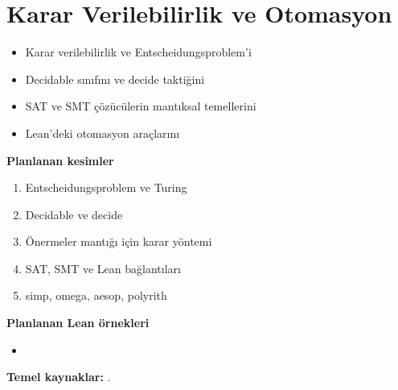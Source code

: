 \chapter{Karar Verilebilirlik ve Otomasyon}\label{bol:otomasyon}

\begin{bolumhedefleri}
\begin{itemize}
  \item Karar verilebilirlik ve Entscheidungsproblem'i
  \item Decidable sınıfını ve decide taktiğini
  \item SAT ve SMT çözücülerin mantıksal temellerini
  \item Lean'deki otomasyon araçlarını
\end{itemize}
\end{bolumhedefleri}

\begin{taslakplan}
\textbf{Planlanan kesimler}
\begin{enumerate}[label=\thechapter.\arabic*, leftmargin=2.4em]
  \item Entscheidungsproblem ve Turing
  \item Decidable ve decide
  \item Önermeler mantığı için karar yöntemi
  \item SAT, SMT ve Lean bağlantıları
  \item simp, omega, aesop, polyrith
\end{enumerate}

\textbf{Planlanan Lean örnekleri}
\begin{itemize}
  \item {}
\end{itemize}

\textbf{Temel kaynaklar:} \citet{turing1936,harrison2009,demoura2008z3}.
\end{taslakplan}

